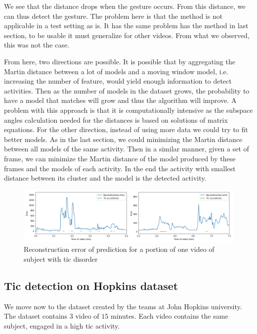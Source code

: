 \documentclass[twocolumn,10pt]{asme2ej}
\begin{document}
We see that the distance drops when the gesture occurs. From this distance, we can thus detect the gesture. The problem here is that the method is not applicable in a test setting as is. It has the same problem has the method in last section, to be usable it must generalize for other videos. From what we observed, this was not the case.

From here, two directions are possible. It is possible that by aggregating the Martin distance between a lot of models and a moving window model, i.e. increasing the number of feature, would yield enough information to detect activities. Then as the number of models in the dataset grows, the probability to have a model that matches will grow and thus the algorithm will improve. A problem with this approach is that it is computationally intensive as the subspace angles calculation needed for the distances is based on solutions of matrix equations. For the other direction, instead of using more data we could try to fit better models. As in the last section, we could minimizing the Martin distance between all models of the same activity. Then in a similar manner, given a set of frame, we can minimize the Martin distance of the model produced by these frames and the models of each activity. In the end the activity with smallest distance between its cluster and the model is the detected activity.

\begin{figure}[ht]
    \centering
    \includegraphics[width=0.8\paperwidth]{tic_detection_pred_error_V12.png}
    \caption{Reconstruction error of prediction for a portion of one video of subject with tic disorder}
    \label{fig:tic-detection-pred-error}
\end{figure}

\subsection{Tic detection on Hopkins dataset}
We move now to the dataset created by the teams at John Hopkins university. The dataset contains $3$ video of $15$ minutes. Each video contains the same subject, engaged in a high tic activity.
\end{document}
